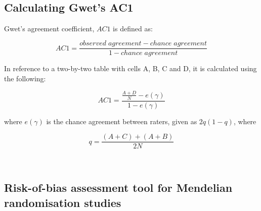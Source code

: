 \documentclass[a4paper, twoside]{templates/ociamthesis}
\begin{document}
~

\hypertarget{appendix-gwet}{%
\subsection{Calculating Gwet's AC1}\label{appendix-gwet}}

Gwet's agreement coefficient, \(AC1\) is defined as:

\begin{equation}
AC1 = \frac{observed\;agreement-chance\;agreement}{1-chance\;agreement}
  \label{eq:AC1-words}
\end{equation}

In reference to a two-by-two table with cells A, B, C and D, it is calculated using the following:

\begin{equation}
  AC1 = \frac{\frac{A+D}{N}-e(\gamma)}{1-e(\gamma)}
  \label{eq:AC1-main}
\end{equation}

where \(e(\gamma)\) is the chance agreement between raters, given as \(2q(1-q)\), where

\begin{equation}
  q = \frac{(A+C)+(A+B)}{2N}
  \label{eq:AC1-supp}
\end{equation}

~

\hypertarget{appendix-mr-rob}{%
\subsection{Risk-of-bias assessment tool for Mendelian randomisation studies}\label{appendix-mr-rob}}
\end{document}
